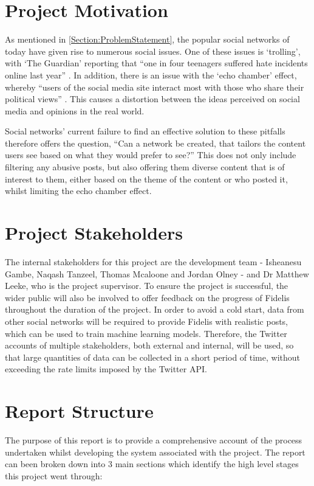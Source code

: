 \section{Project Motivation}
As mentioned in \ref{Section:ProblemStatement}, the popular social networks of today have given rise to numerous social issues. One of these issues is `trolling', with `The Guardian' reporting that ``one in four teenagers suffered hate incidents online last year'' \cite{Gani:Trolling}. In addition, there is an issue with the `echo chamber' effect, whereby ``users of the social media site interact most with those who share their political views'' \cite{Jackson:EchoChamber}. This causes a distortion between the ideas perceived on social media and opinions in the real world.

Social networks' current failure to find an effective solution to these pitfalls therefore offers the question, ``Can a network be created, that tailors the content users see based on what they would prefer to see?'' This does not only include filtering any abusive posts, but also offering them diverse content that is of interest to them, either based on the theme of the content or who posted it, whilst limiting the echo chamber effect.

\section{Project Stakeholders}
The internal stakeholders for this project are the development team - Isheanesu Gambe, Naqash Tanzeel, Thomas Mcaloone and Jordan Olney - and Dr Matthew Leeke, who is the project supervisor. To ensure the project is successful, the wider public will also be involved to offer feedback on the progress of Fidelis throughout the duration of the project. In order to avoid a cold start, data from other social networks will be required to provide Fidelis with realistic posts, which can be used to train machine learning models. Therefore, the Twitter accounts of multiple stakeholders, both external and internal, will be used, so that large quantities of data can be collected in a short period of time, without exceeding the rate limits imposed by the Twitter API.

\section{Report Structure}
The purpose of this report is to provide a comprehensive account of the process undertaken whilst developing the system associated with the project. The report can been broken down into 3 main sections which identify the high level stages this project went through:

